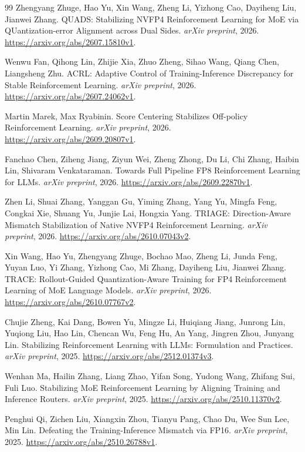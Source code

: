 \begin{thebibliography}{99}
 Zhengyang Zhuge, Hao Yu, Xin Wang, Zheng Li, Yizhong Cao, Dayiheng Liu, Jianwei Zhang. QUADS: Stabilizing NVFP4 Reinforcement Learning for MoE via QUantization-error Alignment across Dual Sides. \emph{arXiv preprint}, 2026. \url{https://arxiv.org/abs/2607.15810v1}.

 Wenwu Fan, Qihong Lin, Zhijie Xia, Zhuo Zheng, Sihao Wang, Qiang Chen, Liangsheng Zhu. ACRL: Adaptive Control of Training-Inference Discrepancy for Stable Reinforcement Learning. \emph{arXiv preprint}, 2026. \url{https://arxiv.org/abs/2607.24062v1}.

 Martin Marek, Max Ryabinin. Score Centering Stabilizes Off-policy Reinforcement Learning. \emph{arXiv preprint}, 2026. \url{https://arxiv.org/abs/2609.20807v1}.

 Fanchao Chen, Ziheng Jiang, Ziyun Wei, Zheng Zhong, Du Li, Chi Zhang, Haibin Lin, Shivaram Venkataraman. Towards Full Pipeline FP8 Reinforcement Learning for LLMs. \emph{arXiv preprint}, 2026. \url{https://arxiv.org/abs/2609.22870v1}.

 Zhen Li, Shuai Zhang, Yanggan Gu, Yiming Zhang, Yang Yu, Mingfa Feng, Congkai Xie, Shuang Yu, Junjie Lai, Hongxia Yang. TRIAGE: Direction-Aware Mismatch Stabilization of Native NVFP4 Reinforcement Learning. \emph{arXiv preprint}, 2026. \url{https://arxiv.org/abs/2610.07043v2}.

 Xin Wang, Hao Yu, Zhengyang Zhuge, Bochao Mao, Zheng Li, Junda Feng, Yuyan Luo, Yi Zhang, Yizhong Cao, Mi Zhang, Dayiheng Liu, Jianwei Zhang. TRACE: Rollout-Guided Quantization-Aware Training for FP4 Reinforcement Learning of MoE Language Models. \emph{arXiv preprint}, 2026. \url{https://arxiv.org/abs/2610.07767v2}.

 Chujie Zheng, Kai Dang, Bowen Yu, Mingze Li, Huiqiang Jiang, Junrong Lin, Yuqiong Liu, Hao Lin, Chencan Wu, Feng Hu, An Yang, Jingren Zhou, Junyang Lin. Stabilizing Reinforcement Learning with LLMs: Formulation and Practices. \emph{arXiv preprint}, 2025. \url{https://arxiv.org/abs/2512.01374v3}.

 Wenhan Ma, Hailin Zhang, Liang Zhao, Yifan Song, Yudong Wang, Zhifang Sui, Fuli Luo. Stabilizing MoE Reinforcement Learning by Aligning Training and Inference Routers. \emph{arXiv preprint}, 2025. \url{https://arxiv.org/abs/2510.11370v2}.

 Penghui Qi, Zichen Liu, Xiangxin Zhou, Tianyu Pang, Chao Du, Wee Sun Lee, Min Lin. Defeating the Training-Inference Mismatch via FP16. \emph{arXiv preprint}, 2025. \url{https://arxiv.org/abs/2510.26788v1}.


\end{thebibliography}
